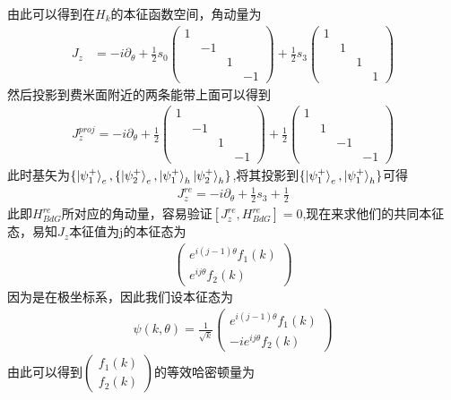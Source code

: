 \documentclass[22pt]{article}
\begin{document}
由此可以得到在$H_k$的本征函数空间，角动量为
\begin{align}
	J_z 	&=-i\partial_{\theta}+\frac{1}{2}s_0
	\begin{pmatrix}
		1&&&\\
		&-1&&\\
		&&1&\\
		&&&-1
	\end{pmatrix}
	+\frac{1}{2}s_3
	\begin{pmatrix}
		1&&&\\
		&1&&\\
		&&1&\\
		&&&1
	\end{pmatrix}
\end{align}
然后投影到费米面附近的两条能带上面可以得到
\begin{align}
	J_z^{proj}=-i\partial_{\theta}+\frac{1}{2}
	\begin{pmatrix}
		1&&&\\
		&-1&&\\
		&&1&\\
		&&&-1
	\end{pmatrix}
+\frac{1}{2}
\begin{pmatrix}
	1&&&\\
	&1&&\\
	&&-1&\\
	&&&-1
\end{pmatrix}
\end{align}
此时基矢为$\{\ket{\psi_{1}^+}_e,\{\ket{\psi_{2}^+}_e,\ket{\psi_1^+}_h\ket{\psi_2^+}_h\}$,将其投影到$\{\ket{\psi_{1}^+}_e,\ket{\psi_1^+}_h\}$可得
\begin{align}
	J_z^{re}=-i\partial_{\theta}+\frac{1}{2}s_3+\frac{1}{2}
\end{align}
此即$H_{BdG}^{re}$所对应的角动量，容易验证$[J_z^{re},H_{BdG}^{re}]=0$,现在来求他们的共同本征态，易知$J_z$本征值为j的本征态为
\begin{align}
	\begin{pmatrix}
		e^{i(j-1)\theta}f_1(k)\\
		e^{ij\theta}f_2(k)
	\end{pmatrix}
\end{align}
因为是在极坐标系，因此我们设本征态为
\begin{align}
	\psi(k,\theta)=\frac{1}{\sqrt{k}}
	\begin{pmatrix}
		e^{i(j-1)\theta}f_1(k)\\
		-ie^{ij\theta}f_2(k)
	\end{pmatrix}
\end{align}
 由此可以得到$\begin{pmatrix}
 	f_1(k)\\
 	f_2(k)
 \end{pmatrix}$的等效哈密顿量为
\end{document}
